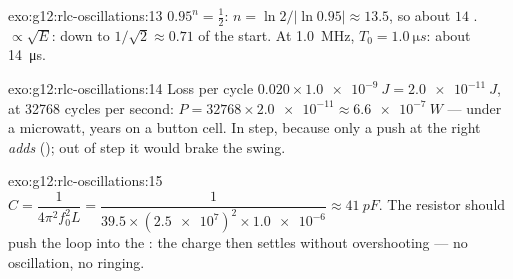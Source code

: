 \begin{solution}{exo:g12:rlc-oscillations:13}
$0.95^n = \tfrac12$: $n = \ln 2/\lvert\ln 0.95\rvert \approx 13.5$,
so about $14$ .  $\propto \sqrt{E}$: down to
$1/\sqrt{2} \approx 0.71$ of the start. At \qty{1.0}{MHz},
$T_0 = \qty{1.0}{\micro s}$: about \qty{14}{\micro s}.
\end{solution}

\begin{solution}{exo:g12:rlc-oscillations:14}
Loss per cycle $0.020 \times \qty{1.0e-9}{J} = \qty{2.0e-11}{J}$, at
\num{32768} cycles per second: $P = \num{32768} \times \num{2.0e-11}
\approx \qty{6.6e-7}{W}$ --- under a microwatt, years on a button
cell. In step, because only a push at the right  \emph{adds}
 (); out of step it would brake the swing.
\end{solution}

\begin{solution}{exo:g12:rlc-oscillations:15}
$C = \dfrac{1}{4\pi^2 f_0^2 L} = \dfrac{1}{39.5 \times
(\num{2.5e7})^2 \times \num{1.0e-6}} \approx \qty{41}{pF}$. The
resistor should push the loop into the : the charge
then settles without overshooting --- no oscillation, no ringing.
\end{solution}

